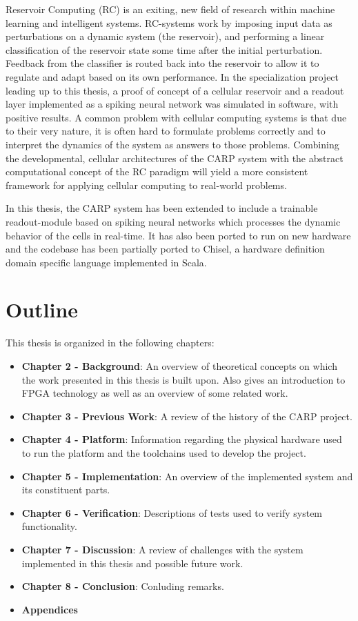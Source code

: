 Reservoir Computing (RC) is an exiting, new field of research within machine
learning and intelligent systems. RC-systems work by imposing input data as
perturbations on a dynamic system (the reservoir), and performing a linear
classification of the reservoir state some time after the initial perturbation.
Feedback from the classifier is routed back into the reservoir to allow it to
regulate and adapt based on its own performance. In the specialization project
leading up to this thesis, a proof of concept of a cellular reservoir and a
readout layer implemented as a spiking neural network was simulated in software,
with positive results. A common problem with cellular computing systems is that
due to their very nature, it is often hard to formulate problems correctly and
to interpret the dynamics of the system as answers to those problems. Combining
the developmental, cellular architectures of the CARP system with the abstract
computational concept of the RC paradigm will yield a more consistent framework
for applying cellular computing to real-world problems. 

In this thesis, the CARP system has been extended to include a trainable
readout-module based on spiking neural networks which processes the dynamic
behavior of the cells in real-time. It has also been ported to run on new
hardware and the codebase has been partially ported to Chisel, a hardware
definition domain specific language implemented in Scala.

\section{Outline}

This thesis is organized in the following chapters:

\begin{itemize}
\item \textbf{Chapter 2 - Background}: An overview of theoretical concepts on which the
  work presented in this thesis is built upon. Also gives an introduction to
  FPGA technology as well as an overview of some related work.
\item \textbf{Chapter 3 - Previous Work}: A review of the history of the CARP project.
\item \textbf{Chapter 4 - Platform}: Information regarding the physical hardware used to
  run the platform and the toolchains used to develop the project.
\item \textbf{Chapter 5 - Implementation}: An overview of the implemented system and its
  constituent parts.
\item \textbf{Chapter 6 - Verification}: Descriptions of tests used to verify system functionality.
\item \textbf{Chapter 7 - Discussion}: A review of challenges with the system implemented
  in this thesis and possible future work.
\item \textbf{Chapter 8 - Conclusion}: Conluding remarks.
\item \textbf{Appendices}
\end{itemize}

\cleardoublepage

